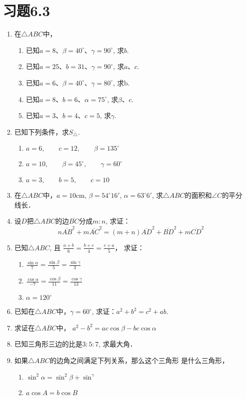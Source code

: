 \section*{习题6.3}
\begin{enumerate}
    \item 在$\triangle ABC$中，
\begin{enumerate}
    \item 已知$a=8$、$\beta=40^{\circ}$、$\gamma=90^{\circ}$, 求$b$.
    \item 已知$a=25$、$b=31$、$\gamma=90^{\circ}$, 求$a$、$c$.
    \item 已知$a=6$、$\beta=40^{\circ}$、$\gamma=80^{\circ}$, 求b.
    \item 已知$a=8$、$b=6$、$\alpha=75^{\circ}$, 求$\beta$、$c$.
    \item 已知$a=3$、$b=4$、$c=5$, 求$\gamma$.
\end{enumerate}
\item  已知下列条件，求$S_{\triangle}$.
\begin{enumerate}
    \item $a=6,\qquad c=12,\qquad \beta =135^{\circ}$
    \item $a=10,\qquad \beta =45^{\circ},\qquad \gamma=60^{\circ}$
    \item $a=3,\qquad b=5,\qquad c=10$
\end{enumerate}

\item  在$\triangle ABC$中，$a=10$cm, $\beta =54^{\circ}16'$, $\alpha=63^{\circ}6'$, 求$\triangle ABC$的面积和$\angle C$的平分线长．
\item  设$D$把$\triangle ABC$的边$\overline{BC}$分成$m:n$, 求证：
\[n\overline{AB}^2+m \overline{AC}^2=(m+n)\overline{AD}^2+\overline{BD}^2+m\overline{CD}^2\]
\item  已知$\triangle ABC$, 且
$\frac{a+b}{6}=\frac{b+c}{4}=\frac{c+a}{5}$，
求证：
\begin{enumerate}
    \item $\frac{\sin\alpha}{7}=\frac{\sin\beta}{5}=\frac{\sin\gamma}{3}$
    \item $\frac{\cos\alpha}{-7}=\frac{\cos\beta}{11}=\frac{\cos\gamma}{13}$
    \item $\alpha=120^{\circ}$
\end{enumerate}
\item  已知在$\triangle ABC$中，$\gamma=60^{\circ}$, 求证：$a^2+b^2=c^2+ab$.
\item  求证在$\triangle ABC$中，
$a^2-b^2=ac\cos\beta -bc\cos\alpha$
\item  已知三角形三边的比是$3:5:7$, 求最大角．
\item  如果$\triangle ABC$的边角之间满足下列关系，那么这个三角形
是什么三角形，
\begin{enumerate}
    \item $\sin^2\alpha=\sin^2\beta +\sin^\gamma$
    \item $a\cos A=b\cos B$
\end{enumerate}


\end{enumerate}
